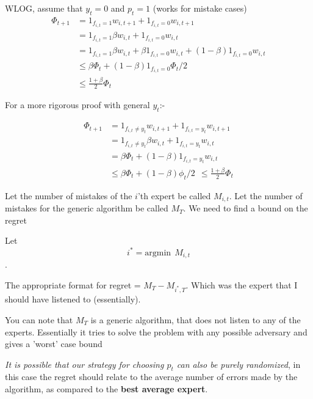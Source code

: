WLOG, assume that $y_t = 0$ and $p_t = 1$ (works for mistake cases)
\begin{align}
        \Phi_{t + 1}  &= 1_{f_{i, t} = 1} w_{i, t+1} + 1_{f_{i,t} = 0} w_{i, t+1}
        \\
        &= 1_{f_{i, t} = 1} \beta w_{i, t} + 1_{f_{i,t} = 0} w_{i, t}
        \\
        &= 1_{f_{i, t} = 1} \beta  w_{i, t} + \beta 1_{f_{i,t} = 0} w_{i, t} + (1 - \beta)1_{f_{i, t} = 0}  w_{i, t}
        \\
        &\le  \beta \Phi_t + (1 - \beta)1_{f_{i, t} = 0}  \Phi_t/2
        \\
        &\le \frac{1 + \beta}{2} \Phi_t
\end{align}

For a more rigorous proof with general $y_t$:-

\begin{align}
    \Phi_{t + 1}  &= 1_{f_{i, t} \neq y_t} w_{i, t+1} + 1_{f_{i,t} = y_t} w_{i, t+1}
    \\
    &= 1_{f_{i, t} \neq y_t} \beta w_{i, t} + 1_{f_{i,t} = y_t} w_{i, t}
    \\
    &= \beta \Phi_t + (1 - \beta)1_{f_{i, t} = y_t}  w_{i, t}
    \\
    & \le \beta \Phi_t + (1 - \beta)\phi_t/2 \ \ \le \frac{1 + \beta }{2} \Phi_t
\end{align}

Let the number of mistakes of the $i$'th expert  be called $M_{i, t}$. Let the number of mistakes for the generic algorithm be called $M_T$.
We need to find a bound on the regret


Let $$i^* = \text{argmin} \ \ M_{i, t}$$. 


The appropriate format for regret = $M_{T} - M_{i^*, T}$. Which was the expert that I should have listened to (essentially).

You can note that $M_T$ is a generic algorithm, that does not listen to any of the experts. Essentially it tries to solve the problem with any possible adversary and gives a 'worst' case bound

\textit{It is possible that our strategy for choosing $p_t$ can also be purely randomized}, in this case the regret should relate to the average number of errors made by the algorithm, as 
compared to the \textbf{best average expert}.


